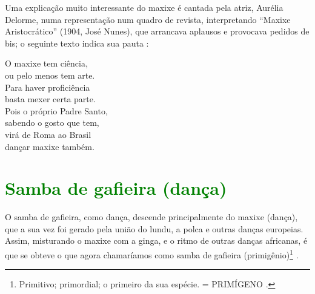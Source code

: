 Uma explicação muito interessante do maxixe é cantada pela atriz, Aurélia Delorme,
numa representação num quadro de revista, interpretando  ``Maxixe Aristocrático'' (1904, José Nunes), 
que arrancava aplausos e provocava pedidos de bis;
o seguinte texto indica sua pauta \cite[pp. 80-81]{efege1974maxixe} \cite{REIS2003}: 
\begin{citando}
O maxixe tem ciência,\\
ou pelo menos tem arte.\\
Para haver proficiência\\
basta mexer certa parte.\\
Pois o próprio Padre Santo,\\
sabendo o gosto que tem,\\
virá de Roma ao Brasil\\
dançar maxixe também.\\ 
\end{citando}



\section{\textcolor{green}{Samba de gafieira (dança)}}
O samba de gafieira, como dança, descende principalmente do maxixe (dança),
que a sua vez foi gerado  pela união do  lundu, 
a polca e outras danças europeias.
Assim, misturando o maxixe com a ginga, e o ritmo de outras danças africanas, 
é que se obteve o que agora chamaríamos como samba de gafieira (primigênio)\footnote{
Primitivo; primordial; o primeiro da sua espécie. = PRIMÍGENO \cite{priberamprimigenio}.
} \cite[pp. 139]{perna2002samba}.




